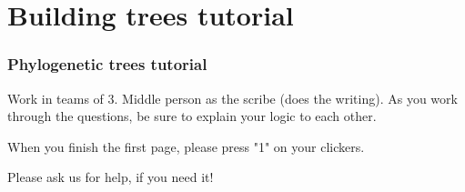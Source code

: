 \section{Building trees tutorial}

\begin{frame}
    \frametitle{Phylogenetic trees tutorial}

    \vspace{1cm}
    Work in teams of 3. Middle person as the scribe (does the writing). As you
    work through the questions, be sure to explain your logic to each other.

    \vspace{1cm}
    When you finish the first page, please press "1" on your clickers.

    \vspace{1cm}
    Please ask us for help, if you need it!
\end{frame}









